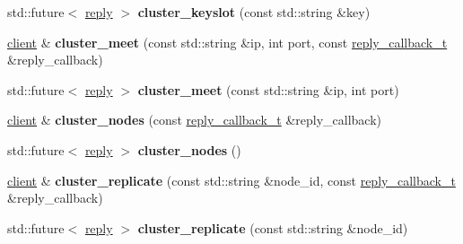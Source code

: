 \begin{DoxyCompactItemize}
\item 
\mbox{\label{classcpp__redis_1_1client_a5681ac2dfdacc19cde1a828d8b801df1}} 
std\+::future$<$ \hyperlink{classcpp__redis_1_1reply}{reply} $>$ {\bfseries cluster\+\_\+keyslot} (const std\+::string \&key)
\item 
\mbox{\label{classcpp__redis_1_1client_aefc94be1dc7eb11673ba92bc8cbffdcf}} 
\hyperlink{classcpp__redis_1_1client}{client} \& {\bfseries cluster\+\_\+meet} (const std\+::string \&ip, int port, const \hyperlink{classcpp__redis_1_1client_a061a1140d36d2eaeda82b09a0bb3f9f2}{reply\+\_\+callback\+\_\+t} \&reply\+\_\+callback)
\item 
\mbox{\label{classcpp__redis_1_1client_af142b166d5f88f76f5fd46e6e33c0523}} 
std\+::future$<$ \hyperlink{classcpp__redis_1_1reply}{reply} $>$ {\bfseries cluster\+\_\+meet} (const std\+::string \&ip, int port)
\item 
\mbox{\label{classcpp__redis_1_1client_a1e4cc880ce249fcad1b1f6ddd15f515f}} 
\hyperlink{classcpp__redis_1_1client}{client} \& {\bfseries cluster\+\_\+nodes} (const \hyperlink{classcpp__redis_1_1client_a061a1140d36d2eaeda82b09a0bb3f9f2}{reply\+\_\+callback\+\_\+t} \&reply\+\_\+callback)
\item 
\mbox{\label{classcpp__redis_1_1client_a6e777dc7b54ecb4aff3e1c281f92dd81}} 
std\+::future$<$ \hyperlink{classcpp__redis_1_1reply}{reply} $>$ {\bfseries cluster\+\_\+nodes} ()
\item 
\mbox{\label{classcpp__redis_1_1client_a65688223390e47c0400ba4a128000f89}} 
\hyperlink{classcpp__redis_1_1client}{client} \& {\bfseries cluster\+\_\+replicate} (const std\+::string \&node\+\_\+id, const \hyperlink{classcpp__redis_1_1client_a061a1140d36d2eaeda82b09a0bb3f9f2}{reply\+\_\+callback\+\_\+t} \&reply\+\_\+callback)
\item 
\mbox{\label{classcpp__redis_1_1client_a4ce5b739522aefd5ca7c8aef8c76cc61}} 
std\+::future$<$ \hyperlink{classcpp__redis_1_1reply}{reply} $>$ {\bfseries cluster\+\_\+replicate} (const std\+::string \&node\+\_\+id)
\item 

\end{DoxyCompactItemize}
